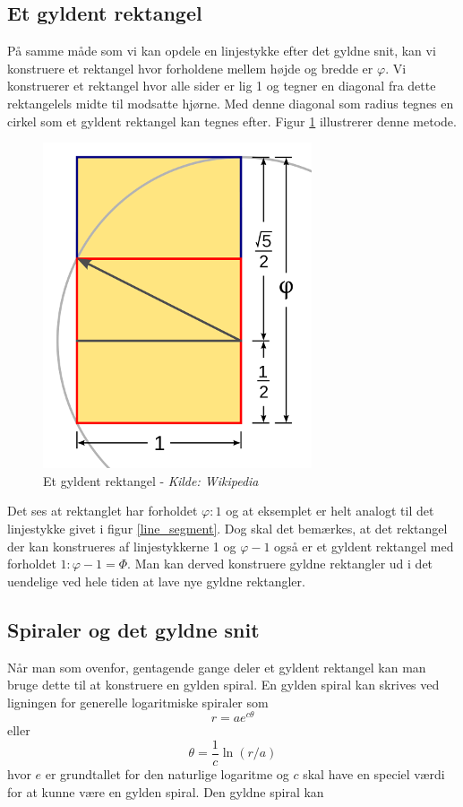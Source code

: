 {\subsection{Et gyldent rektangel}
På samme måde som vi kan opdele en linjestykke efter det gyldne snit,
kan vi konstruere et rektangel hvor forholdene mellem højde og bredde er
$\varphi$. Vi konstruerer et rektangel hvor alle sider er lig 1 og
tegner en diagonal fra dette rektangelels midte til modsatte hjørne. Med
denne diagonal som radius tegnes en cirkel som et gyldent rektangel kan
tegnes efter. Figur \ref{golden_rectangle} illustrerer denne metode.

\begin{figure}[h!]
	\begin{center}
		\includegraphics[scale=0.35,angle=0]{afsnit/baggrund/billeder/Golden_Rectangle_Construction}
	\end{center}
	\caption[Et gyldent rektangel]{Et gyldent rektangel - \emph{Kilde: Wikipedia}}
	\label{golden_rectangle}
\end{figure}
Det ses at rektanglet har forholdet $\varphi:1$ og at eksemplet er helt
analogt til det linjestykke givet i figur \ref{line_segment}. Dog skal
det bemærkes, at det rektangel der kan konstrueres af linjestykkerne 1
og $\varphi - 1$ også er et gyldent rektangel med forholdet $1:\varphi
-1 = \varPhi$. Man kan derved konstruere gyldne rektangler ud i det
uendelige ved hele tiden at lave nye gyldne rektangler.

\subsection{Spiraler og det gyldne snit}
Når man som ovenfor, gentagende gange deler et gyldent rektangel kan man
bruge dette til at konstruere en gylden spiral. En gylden spiral kan
skrives ved ligningen for generelle logaritmiske spiraler som
\begin{equation}
	r = ae^{c\theta}
	\label{log_spiral_2}
\end{equation}
eller
\begin{equation}
	\theta = \frac{1}{c}\ln(r/a)
	\label{log_spiral_1}
\end{equation}
hvor $e$ er grundtallet for den naturlige logaritme og $c$ skal have en
speciel værdi for at kunne være en gylden spiral. Den gyldne spiral kan

}
